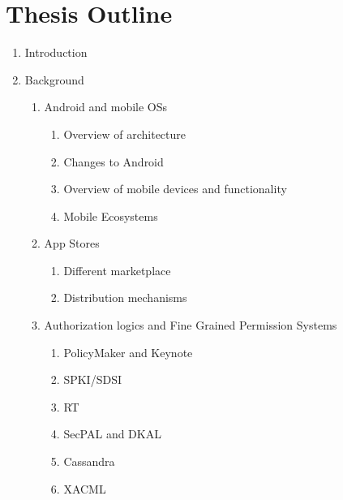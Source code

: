 \documentclass[a4paper]{scrartcl}
\begin{document}



\pagebreak
\appendix
\section{Thesis Outline}
\label{sec:thesis-outline}

\begin{enumerate}
\item Introduction
\item Background
  \begin{enumerate}[2.1]
  \item Android and mobile OSs
    \begin{enumerate}[2.1.1]
    \item Overview of architecture
    \item Changes to Android
    \item Overview of mobile devices and functionality
    \item Mobile Ecosystems
    \end{enumerate}
  \item App Stores
    \begin{enumerate}[2.2.1]
    \item Different marketplace
    \item Distribution mechanisms
    \end{enumerate}
  \item Authorization logics and Fine Grained Permission Systems
    \begin{enumerate}[2.3.1]
    \item PolicyMaker and Keynote
    \item SPKI/SDSI
    \item RT
    \item SecPAL and DKAL
    \item Cassandra
    \item XACML
   

\end{enumerate}
\end{enumerate}
\end{enumerate}
\end{document}
